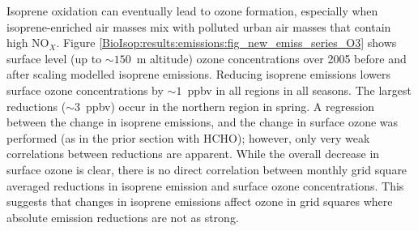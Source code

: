       Isoprene oxidation can eventually lead to ozone formation, especially when isoprene-enriched air masses mix with polluted urban air masses that contain high NO$_X$.
      Figure \ref{BioIsop:results:emissions:fig_new_emiss_series_O3} shows surface level (up to $\sim{150}$~m altitude) ozone concentrations over 2005 before and after scaling modelled isoprene emissions.
      Reducing isoprene emissions lowers surface ozone concentrations by $\sim1$~ppbv in all regions in all seasons.
      The largest reductions ($\sim3$~ppbv) occur in the northern region in spring.
      A regression between the change in isoprene emissions, and the change in surface ozone was performed (as in the prior section with HCHO); however, only very weak correlations between reductions are apparent.
      While the overall decrease in surface ozone is clear, there is no direct correlation between monthly grid square averaged reductions in isoprene emission and surface ozone concentrations.
      This suggests that changes in isoprene emissions affect ozone in grid squares where absolute emission reductions are not as strong.
      
      
      
